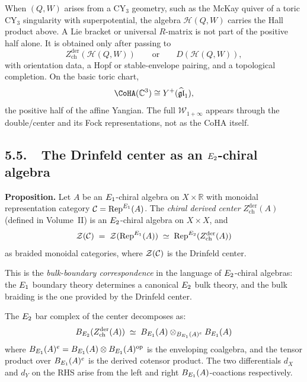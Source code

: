 When $(Q, W)$ arises from a CY$_3$ geometry, such as the McKay quiver
of a toric CY$_3$ singularity with superpotential, the algebra
$\mathcal{H}(Q,W)$ carries the Hall product above. A Lie bracket or
universal $R$-matrix is not part of the positive half alone. It is
obtained only after passing to
\[
 Z_{\mathrm{ch}}^{\mathrm{der}}(\mathcal{H}(Q,W))
 \qquad\text{or}\qquad
 D(\mathcal{H}(Q,W)),
\]
with orientation data, a Hopf or stable-envelope pairing, and a
topological completion. On the basic toric chart,
\[
 \CoHA(\mathbb{C}^3) \cong Y^+(\widehat{\mathfrak{gl}}_1),
\]
the positive half of the affine Yangian. The full
$\mathcal{W}_{1+\infty}$ appears through the double/center and its Fock
representations, not as the CoHA itself.

\subsection*{5.5.\ \ The Drinfeld center as an $E_2$-chiral algebra}

\medskip
\noindent\textbf{Proposition}\textbf{.}\;
Let $A$ be an $E_1$-chiral algebra on $X \times \mathbb{R}$ with
monoidal representation category
$\mathcal{C} = \mathrm{Rep}^{E_1}(A)$. The \emph{chiral derived center}
$Z_{\mathrm{ch}}^{\mathrm{der}}(A)$ (defined in Volume~II) is
an $E_2$-chiral algebra on $X \times X$, and
\begin{equation}\label{eq:center-e2}
 \mathcal{Z}(\mathcal{C}) \;=\; \mathcal{Z}(\mathrm{Rep}^{E_1}(A))
 \;\simeq\;
 \mathrm{Rep}^{E_2}(Z_{\mathrm{ch}}^{\mathrm{der}}(A))
\end{equation}
as braided monoidal categories, where $\mathcal{Z}(\mathcal{C})$ is the Drinfeld
center.

This is the \emph{bulk-boundary correspondence} in the language of
$E_2$-chiral algebras: the $E_1$ boundary theory determines a
canonical $E_2$ bulk theory, and the bulk braiding is the one
provided by the Drinfeld center.

The $E_2$ bar complex of the center decomposes as:
\begin{equation}\label{eq:center-bar}
 B_{E_2}(Z_{\mathrm{ch}}^{\mathrm{der}}(A))
 \;\simeq\;
 B_{E_1}(A) \otimes_{B_{E_1}(A)^e} B_{E_1}(A)
\end{equation}
where $B_{E_1}(A)^e = B_{E_1}(A) \otimes B_{E_1}(A)^{\mathrm{op}}$
is the enveloping coalgebra, and the tensor product over $B_{E_1}(A)^e$
is the derived cotensor product. The two differentials $d_X$ and $d_Y$
on the RHS arise from the left and right $B_{E_1}(A)$-coactions
respectively.


